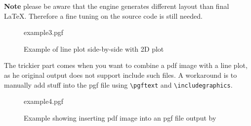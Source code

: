 \textbf{Note} please be aware that the \mpl{} engine generates
different layout than final \LaTeX{}. Therefore a fine tuning on the
\py{} source code is still needed.

\begin{figure}[htbp]
  \centering
  {example3.pgf}
  \caption{Example of line plot side-by-side with 2D plot}
  \label{fig:fig3}
\end{figure}

The trickier part comes when you want to combine a pdf image with a
line plot, as he original \mpl{} output does not support include such
files. A workaround is to manually add stuff into the pgf file using
\verb|\pgftext| and \verb|\includegraphics|.

\begin{figure}[htbp]
  \centering
  {example4.pgf}
  \caption{Example showing inserting pdf image into an pgf file output by \mpl{}}
  \label{fig:fig4}
\end{figure}

  

